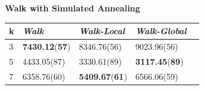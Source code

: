 \documentclass[12pt,a4paper,twoside]{scrartcl}
\numberwithin{equation}{section}
\begin{document}
\clearpage
\textbf{Walk with Simulated Annealing}\\
\begin{table}[H]
\begin{center}
    \begin{tabular}{|l|l|l|l|p{3cm}|}
\hline 
    k &\emph{Walk}&\emph{Walk-Local}&\emph{Walk-Global} \\ \hline      
    3 &\textbf{7430.12}(\textbf{57})&	8346.76(56)	&9023.96(56)  \\ \hline
    5&4433.05(87)	&3330.61(89)	&\textbf{3117.45}(\textbf{89}) \\ \hline
    7&6358.76(60)	&\textbf{5409.67}(\textbf{61})&	6566.06(59) \\ \hline	

\end{tabular}
\end{center}
\end{table} 
\end{document}
